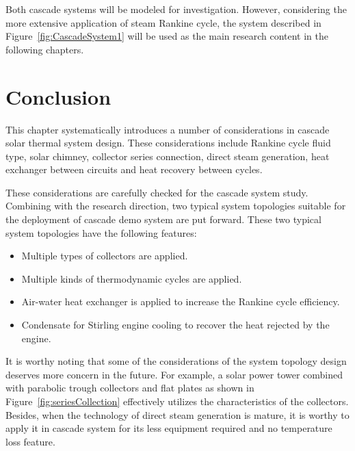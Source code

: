 Both cascade systems will be modeled for investigation. However, considering the more extensive application of steam Rankine cycle, the system described in Figure~\ref{fig:CascadeSystem1} will be used as the main research content in the following chapters.

\section{Conclusion}
This chapter systematically introduces a number of considerations in cascade solar thermal system design. These considerations include Rankine cycle fluid type, solar chimney, collector series connection, direct steam generation, heat exchanger between circuits and heat recovery between cycles. 

These considerations are carefully checked for the cascade system study. Combining with the research direction, two typical system topologies suitable for the deployment of cascade demo system are put forward. These two typical system topologies have the following features:

\begin{itemize}
  \item Multiple types of collectors are applied.
  \item Multiple kinds of thermodynamic cycles are applied. 
  \item Air-water heat exchanger is applied to increase the Rankine cycle efficiency.
  \item Condensate for Stirling engine cooling to recover the heat rejected by the engine.
\end{itemize}

It is worthy noting that some of the considerations of the system topology design deserves more concern in the future. For example, a solar power tower combined with parabolic trough collectors and flat plates as shown in Figure~\ref{fig:seriesCollection} effectively utilizes the characteristics of the collectors. Besides, when the technology of direct steam generation is mature, it is worthy to apply it in cascade system for its less equipment required and no temperature loss feature.
